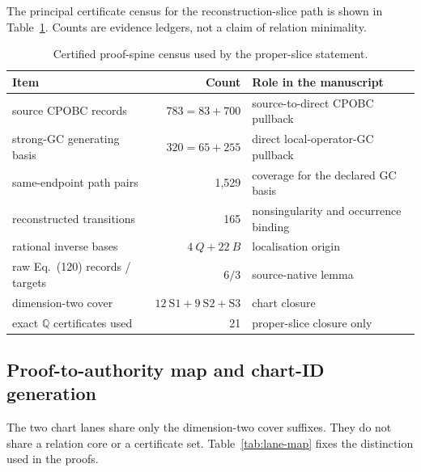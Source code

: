 \documentclass[11pt]{article}
\theoremstyle{definition}
\theoremstyle{remark}
\newcommand{\QQ}{\mathbb{Q}}
\begin{document}
The principal certificate census for the reconstruction-slice path is
shown in Table~\ref{tab:spine}.  Counts are evidence ledgers, not a claim of
relation minimality.

\begin{table}[ht]
\centering
\caption{Certified proof-spine census used by the proper-slice statement.}
\label{tab:spine}
\begin{tabularx}{\textwidth}{@{}l r X@{}}
\toprule
Item & Count & Role in the manuscript\\
\midrule
source CPOBC records & \(783=83+700\) & source-to-direct CPOBC pullback\\
strong-GC generating basis & \(320=65+255\) & direct local-operator-GC pullback\\
same-endpoint path pairs & 1,529 & coverage for the declared GC basis\\
reconstructed transitions & 165 & nonsingularity and occurrence binding\\
rational inverse bases & \(4\ Q+22\ B\) & localisation origin\\
raw Eq.~(120) records / targets & \(6/3\) & source-native lemma\\
dimension-two cover & \(12\ \mathrm{S1}+9\ \mathrm{S2}+\mathrm{S3}\) & chart closure\\
exact \(\QQ\) certificates used & 21 & proper-slice closure only\\
\bottomrule
\end{tabularx}
\end{table}

\subsection*{Proof-to-authority map and chart-ID generation}

The two chart lanes share only the dimension-two cover suffixes.  They do not
share a relation core or a certificate set.  Table~\ref{tab:lane-map} fixes
the distinction used in the proofs.
\end{document}
